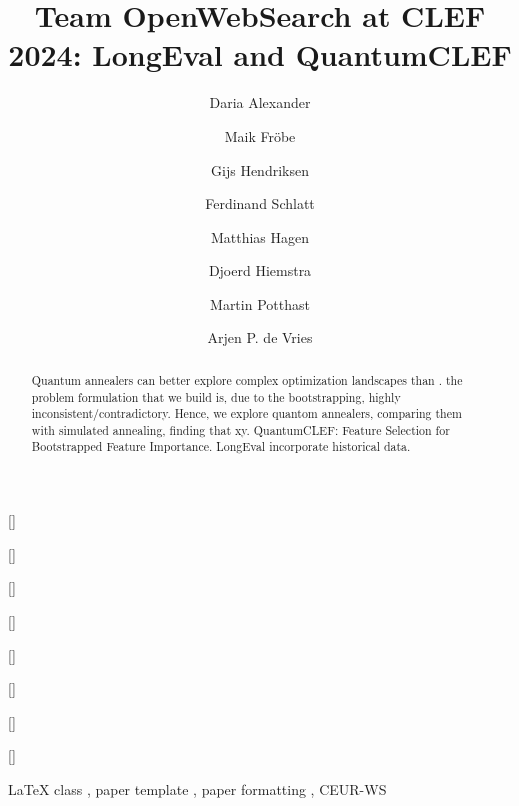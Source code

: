 


\title{Team OpenWebSearch at CLEF 2024: LongEval and QuantumCLEF}

\address[1]{Radboud Universiteit Nijmegen}
\address[2]{Friedrich-Schiller-Universit{\"a}t Jena}
\address[3]{University of Kassel, hessian.AI, ScaDS.AI}


\author[1]{Daria Alexander}[]
\author[2]{Maik Fr{\"o}be}[]
\author[1]{Gijs Hendriksen}[]
\author[2]{Ferdinand Schlatt}[]
\author[2]{Matthias Hagen}[]
\author[1]{Djoerd Hiemstra}[]
\author[3]{Martin Potthast}[]
\author[1]{Arjen P. de Vries}[]


\begin{abstract}
  Quantum annealers can better explore complex optimization landscapes than . the problem formulation that we build is, due to the bootstrapping, highly inconsistent/contradictory. Hence, we explore quantom annealers, comparing them with simulated annealing, finding that xy. QuantumCLEF: Feature Selection for Bootstrapped Feature Importance.
  LongEval incorporate historical data.
\end{abstract}

\begin{keywords}
  LaTeX class \sep
  paper template \sep
  paper formatting \sep
  CEUR-WS
\end{keywords}

\maketitle
